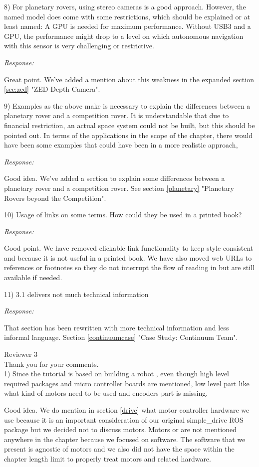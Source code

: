 \documentclass[runningheads,a4paper]{llncs}
\newcommand{\rsp}{\noindent \textit{Response:}}
\newcommand{\rev}[1]{
\newpage
\noindent Reviewer {#1}\\

\noindent Thank you for your comments.\\
}
\begin{document}
8)  For planetary rovers, using stereo cameras is a good approach. However, the named model does come with some restrictions, which should be explained or at least named: A GPU is needed for maximum performance. Without USB3 and a GPU, the performance might drop to a level on which autonomous navigation with this sensor is very challenging or restrictive.

\rsp

Great point. We've added a mention about this weakness in the expanded section \ref{sec:zed} "ZED Depth Camera".

9) Examples as the above make is necessary to explain the differences between a planetary rover and a competition rover. It is understandable that due to financial restriction, an actual space system could not be built, but this should be pointed out. In terms of the applications in the scope of the chapter, there would have been some examples that could have been in a more realistic approach,

\rsp

Good idea. We've added a section to explain some differences between a planetary rover and a competition rover. See section \ref{planetary} "Planetary Rovers beyond the Competition".

10) Usage of links on some terms. How could they be used in a printed book?

\rsp

Good point. We have removed clickable link functionality to keep style consistent and because it is not useful in a printed book. We have also moved web URLs to references or footnotes so they do not interrupt the flow of reading in but are still available if needed. 

11) 3.1 delivers not much technical information

\rsp

That section has been rewritten with more technical information and less informal language. Section \ref{continuumcase} "Case Study: Continuum Team".

\rev{3}

1)  Since the tutorial is based on building a robot , even though high level required packages and micro controller boards are mentioned, low level part like what kind of motors need to be used and encoders part is missing.

Good idea. We do mention in section \ref{drive} what motor controller hardware we use because it is an important consideration of our original simple\_drive ROS package but we decided not to discuss motors. Motors or are not mentioned anywhere in the chapter because we focused on software. The software that we present is agnostic of motors and we also did not have the space within the chapter length limit to properly treat motors and related hardware.
\end{document}
